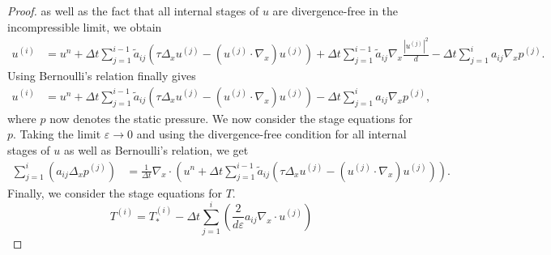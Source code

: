 \documentclass[final,11pt]{siamart251216}
\numberwithin{equation}{section}
\theoremstyle{definition}
\theoremstyle{remark}
\begin{document}
\begin{proof}
as well as the fact that all internal stages of $u$ are divergence-free in the incompressible limit, we obtain
\begin{equation}
\begin{split} \label{FinalForu_}
u^{(i)} &= u^n 
+ \Delta t  \sum_{j=1}^{i-1} \tilde{a}_{ij}  \left( \tau \Delta_x u^{(j)} -  (u^{(j)} \cdot \nabla_x ) u^{(j)}\right) 
+ \Delta t  \sum_{j=1}^{i-1} \tilde{a}_{ij} \nabla_x \frac{|u^{(j)}|^2}{d} 
- \Delta t  \sum_{j = 1}^i  a_{ij} \nabla_x p^{(j)}.
\end{split}
\end{equation}
Using Bernoulli's relation finally gives 
\begin{equation}
\begin{split} \label{FinalForu}
u^{(i)} &= u^n 
+ \Delta t  \sum_{j=1}^{i-1} \tilde{a}_{ij}  \left( \tau \Delta_x u^{(j)} -  (u^{(j)} \cdot \nabla_x ) u^{(j)}\right) 
- \Delta t  \sum_{j = 1}^i  a_{ij} \nabla_x p^{(j)},
\end{split}
\end{equation}
where $p$ now denotes the static pressure.
We now consider the stage equations for $p$. Taking the limit $\varepsilon \to 0$ and using the divergence-free condition for all internal stages of $u$ as well as Bernoulli's relation, we get
\begin{equation}\begin{split} \label{FinalForp}
  \sum_{j = 1}^{i} \left( a_{ij} \Delta_x p^{(j)} \right)  &=  \frac{1}{\Delta t}\nabla_x \cdot \left( u^n + \Delta t  \sum_{j=1}^{i-1} \tilde{a}_{ij}  
 \left( \tau \Delta_x u^{(j)} -  (u^{(j)} \cdot  \nabla_x ) u^{(j)}\right)  \right).
\end{split}
\end{equation} 
Finally, we consider the stage equations for $T$.
\begin{equation}
		T^{(i)} = T_*^{(i)}- \Delta t  \sum_{j = 1}^i \left(  \frac{2}{d \varepsilon} a_{ij} \nabla_x \cdot u^{(j)}\right) 

\end{equation}
\end{proof}
\end{document}
